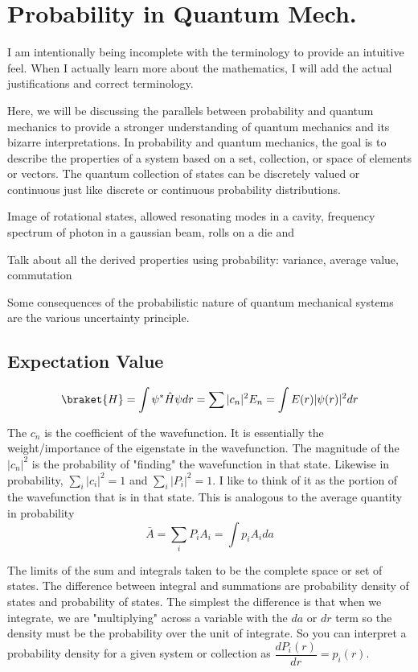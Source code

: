 \documentclass[11pt,a4paper]{book}
\begin{document}
	\section{Probability in Quantum Mech.}
		\label{sec:Probability in Quantum Mech.}
		I am intentionally being incomplete with the terminology to provide an intuitive feel. When I actually learn more about the mathematics, I will add the actual justifications and correct terminology.
		
		Here, we will be discussing the parallels between probability and quantum mechanics to provide a stronger understanding of quantum mechanics and its bizarre interpretations. In probability and quantum mechanics, the goal is to describe the properties of a system based on a set, collection, or space of elements or vectors. The quantum collection of states can be discretely valued or continuous just like discrete or continuous probability distributions.
		
		Image of rotational states, allowed resonating modes in a cavity, frequency spectrum of photon in a gaussian beam, rolls on a die and 
		
		Talk about all the derived properties using probability: variance, average value, commutation
		
		Some consequences of the probabilistic nature of quantum mechanical systems are the various uncertainty principle.
		\subsection{Expectation Value}
			\begin{equation}
				\braket{H}=\int{\psi^* \hat{H} \psi}dr=\sum{|c_n|^2 E_n}=\int{E(r)|\psi(r)|^2dr}
			\end{equation}
			
			The $c_n$ is the coefficient of the wavefunction. It is essentially the weight/importance of the eigenstate in the wavefunction. The magnitude of the $|c_n|^2$ is the probability of "finding" the wavefunction in that state. Likewise in probability, $\sum_i |c_i|^2=1$ and $\sum_i |P_i|^2=1$. I like to think of it as the portion of the wavefunction that is in that state.
			This is analogous to the average quantity in probability
			\begin{equation}
				\bar{A}=\sum_i {P_i A_i}=\int{p_i A_i da}
			\end{equation}
			
			The limits of the sum and integrals taken to be the complete space or set of states. The difference between integral and summations are probability density of states and probability of states. The simplest the difference is that when we integrate, we are "multiplying" across a variable with the $da$ or $dr$ term so the density must be the probability over the unit of integrate. So you can interpret a probability density for a given system or collection as $\dfrac{dP_i(r)}{dr}=p_i(r)$.
	
\end{document}
